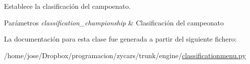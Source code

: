 \-Establece la clasificación del campoenato. 


\begin{DoxyParams}{\-Parámetros}
{\em classification\-\_\-championship} & \-Clasificación del campeonato \\
\hline
\end{DoxyParams}


\-La documentación para esta clase fue generada a partir del siguiente fichero\-:\begin{DoxyCompactItemize}
\item 
/home/jose/\-Dropbox/programacion/zycars/trunk/engine/\hyperlink{classificationmenu_8py}{classificationmenu.\-py}\end{DoxyCompactItemize}
